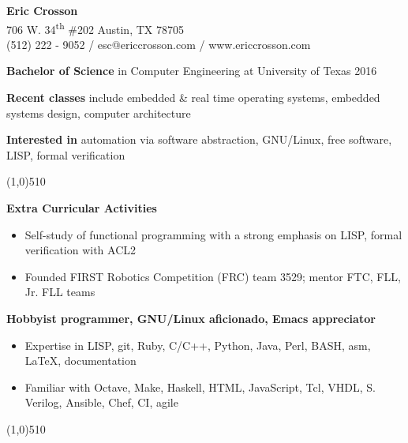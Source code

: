 \documentclass{report}
\newcommand{\cut}{\begin{center} \line(1,0){510} \end{center}}
\begin{document}
\pagestyle{empty}
\setlength\parindent{0pt}

\begin{center}
  \textbf{Eric Crosson} \\
  706 W. 34\textsuperscript{th} \#202 Austin, TX 78705 \\
  (512) 222 - 9052 / esc@ericcrosson.com / www.ericcrosson.com
\end{center}

\textbf{Bachelor of Science} in Computer Engineering at University of Texas
2016

\vspace{1mm}

\textbf{Recent classes} include embedded \& real time operating systems,
embedded systems design, computer architecture

\vspace{1mm}

\textbf{Interested in} automation via software abstraction, GNU/Linux, free
software, LISP, formal verification

\cut{}

\textbf{Extra Curricular Activities}
\begin{itemize}[label=$\circ$]
\item Self-study of functional programming with a strong emphasis on LISP, formal verification with ACL2
\item Founded FIRST Robotics Competition (FRC) team 3529; mentor FTC, FLL, Jr. FLL teams
\end{itemize}

\textbf{Hobbyist programmer, GNU/Linux aficionado, Emacs appreciator}
\begin{itemize}[label=$\circ$]
\item Expertise in LISP, git, Ruby, C/C++, Python, Java, Perl, BASH, asm,
  \LaTeX{}, documentation
\item Familiar with Octave, Make, Haskell, HTML, JavaScript, Tcl, VHDL, S.
  Verilog, Ansible, Chef, CI, agile
\end{itemize}

\cut{}
\end{document}
